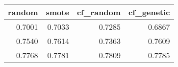 \begin{tabular}{rrrr}
\toprule

 random &  smote &  cf\_random &  cf\_genetic \\
\midrule

 0.7001 & 0.7033 &     0.7285 &      0.6867 \\
 0.7540 & 0.7614 &     0.7363 &      0.7609 \\
 0.7768 & 0.7781 &     0.7809 &      0.7785 \\

\bottomrule
\end{tabular}
